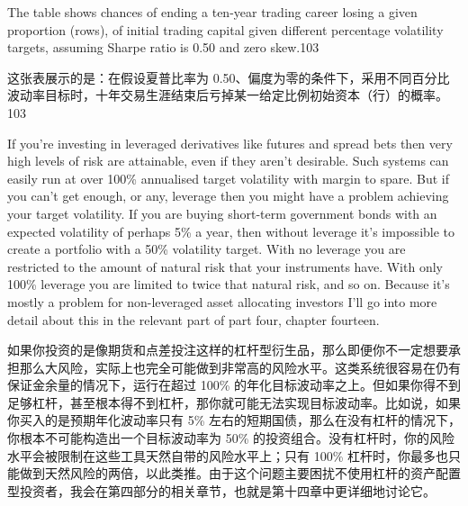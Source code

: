 
\begin{englishblock} The table shows chances of ending a ten-year trading career losing a given proportion (rows), of initial trading capital given different percentage volatility targets, assuming Sharpe ratio is 0.50 and zero skew.103 \end{englishblock}

\begin{chineseblock}这张表展示的是：在假设夏普比率为 0.50、偏度为零的条件下，采用不同百分比波动率目标时，十年交易生涯结束后亏掉某一给定比例初始资本（行）的概率。103 \end{chineseblock}


\begin{englishblock} If you're investing in leveraged derivatives like futures and spread bets then very high levels of risk are attainable, even if they aren't desirable. Such systems can easily run at over 100\% annualised target volatility with margin to spare. But if you can't get enough, or any, leverage then you might have a problem achieving your target volatility. If you are buying short-term government bonds with an expected volatility of perhaps 5\% a year, then without leverage it's impossible to create a portfolio with a 50\% volatility target. With no leverage you are restricted to the amount of natural risk that your instruments have. With only 100\% leverage you are limited to twice that natural risk, and so on. Because it's mostly a problem for non-leveraged asset allocating investors I'll go into more detail about this in the relevant part of part four, chapter fourteen. \end{englishblock}

\begin{chineseblock}如果你投资的是像期货和点差投注这样的杠杆型衍生品，那么即便你不一定想要承担那么大风险，实际上也完全可能做到非常高的风险水平。这类系统很容易在仍有保证金余量的情况下，运行在超过 100\% 的年化目标波动率之上。但如果你得不到足够杠杆，甚至根本得不到杠杆，那你就可能无法实现目标波动率。比如说，如果你买入的是预期年化波动率只有 5\% 左右的短期国债，那么在没有杠杆的情况下，你根本不可能构造出一个目标波动率为 50\% 的投资组合。没有杠杆时，你的风险水平会被限制在这些工具天然自带的风险水平上；只有 100\% 杠杆时，你最多也只能做到天然风险的两倍，以此类推。由于这个问题主要困扰不使用杠杆的资产配置型投资者，我会在第四部分的相关章节，也就是第十四章中更详细地讨论它。\end{chineseblock}


